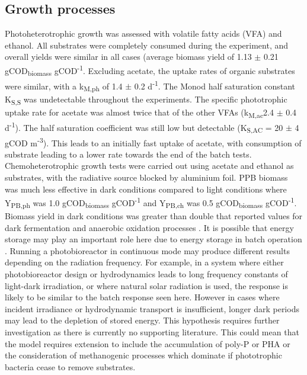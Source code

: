 \subsection{Growth processes}
Photoheterotrophic growth was assessed with volatile fatty acids (VFA) and ethanol. All substrates were completely consumed during the experiment, and overall yields were similar in all cases (average biomass yield of 1.13 $\pm$ 0.21 gCOD\textsubscript{biomass} gCOD\textsuperscript{-1}. Excluding acetate, the uptake rates of organic substrates were similar, with a k\textsubscript{M,ph} of 1.4 $\pm$ 0.2 d\textsuperscript{-1}. The Monod half saturation constant K\textsubscript{S,S} was undetectable throughout the experiments. The specific phototrophic uptake rate for acetate was almost twice that of the other VFAs (k\textsubscript{M,ac}2.4 $\pm$ 0.4 d\textsuperscript{-1}). The half saturation coefficient was still low but detectable (K\textsubscript{S,AC} = 20 $\pm$ 4 gCOD m\textsuperscript{-3}). This leads to an initially fast uptake of acetate, with consumption of substrate leading to a lower rate towards the end of the batch tests. 
\skippingparagraph
Chemoheterotrophic growth tests were carried out using acetate and ethanol as substrates, with the radiative source blocked by aluminium foil. PPB biomass was much less effective in dark conditions compared to light conditions where Y\textsubscript{PB,ph} was 1.0 gCOD\textsubscript{biomass} gCOD\textsuperscript{-1} and Y\textsubscript{PB,ch} was 0.5 gCOD\textsubscript{biomass} gCOD\textsuperscript{-1}. Biomass yield in dark conditions was greater than double that reported values for dark fermentation and anaerobic oxidation processes \cite{batstone2002}. It is possible that energy storage may play an important role here due to energy storage in batch operation \cite{liang2010}. Running a photobioreactor in continuous mode may produce different results depending on the radiation frequency. For example, in a system where either photobioreactor design or hydrodynamics leads to long frequency constants of light-dark irradiation, or where natural solar radiation is used, the response is likely to be similar to the batch response seen here. However in cases where incident irradiance or hydrodynamic transport is insufficient, longer dark periods may lead to the depletion of stored energy. This hypothesis requires further investigation as there is currently no supporting literature. This could mean that the model requires extension to include the accumulation of poly-P or PHA or the consideration of methanogenic processes which dominate if phototrophic bacteria cease to remove substrates.
